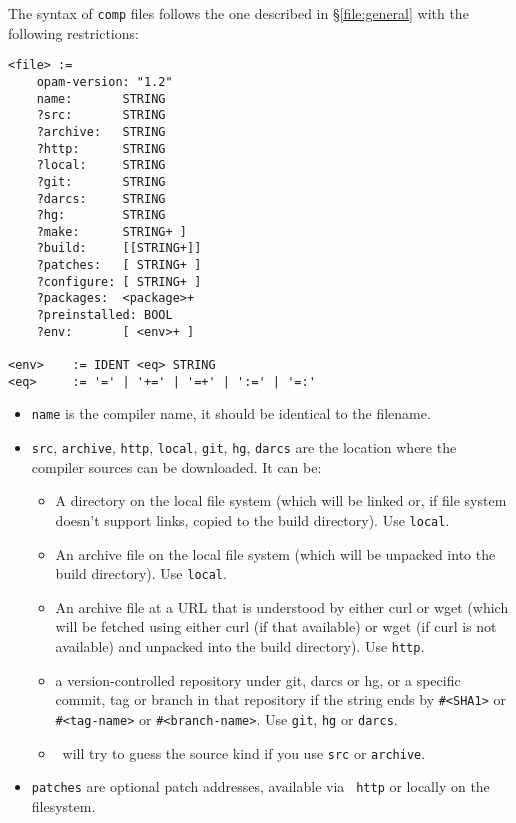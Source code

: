 \documentclass[a4paper,10pt]{article}
\begin{document}
The syntax of {\tt comp} files follows the one described in
\S\ref{file:general} with the following restrictions:

\begin{Verbatim}
<file> :=
    opam-version: "1.2"
    name:       STRING
    ?src:       STRING
    ?archive:   STRING
    ?http:      STRING
    ?local:     STRING
    ?git:       STRING
    ?darcs:     STRING
    ?hg:        STRING
    ?make:      STRING+ ]
    ?build:     [[STRING+]]
    ?patches:   [ STRING+ ]
    ?configure: [ STRING+ ]
    ?packages:  <package>+
    ?preinstalled: BOOL
    ?env:       [ <env>+ ]

<env>    := IDENT <eq> STRING
<eq>     := '=' | '+=' | '=+' | ':=' | '=:'
\end{Verbatim}
\begin{itemize}

\item {\tt name} is the compiler name, it should be identical to the filename.
\item {\tt src}, {\tt archive}, {\tt http}, {\tt local}, {\tt git},
  {\tt hg}, {\tt darcs} are the location where the compiler sources
  can be downloaded. It can be:

\begin{itemize}
\item A directory on the local file system (which will be linked or,
  if file system doesn't support links, copied to the build
  directory). Use {\tt local}.
\item An archive file on the local file system (which will be unpacked
  into the build directory). Use {\tt local}.
\item An archive file at a URL that is understood by either curl or
  wget (which will be fetched using either curl (if that available) or
  wget (if curl is not available) and unpacked into the build
  directory). Use {\tt http}.
\item a version-controlled repository under git, darcs or
  hg, or a specific commit, tag or branch in that repository if
  the string ends by \verb+#<SHA1>+ or \verb+#<tag-name>+ or
  \verb+#<branch-name>+. Use {\tt git}, {\tt hg} or {\tt darcs}.
\item \OPAM\ will try to guess the source kind if you use {\tt src} or
  {\tt archive}.
\end{itemize}

\item {\tt patches} are optional patch addresses, available via {\tt
  http} or locally on the filesystem.


\end{itemize}
\end{document}
